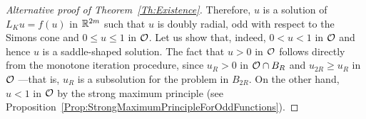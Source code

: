 \begin{proof}[Alternative proof of Theorem~\ref{Th:Existence}]
	Therefore, $u$ is a solution of $L_K u = f(u)$ in $\mathbb{R}^{2m}$ such that $u$ is doubly radial, odd with respect to the Simons cone and $0\leq u \leq 1$ in $\mathcal{O}$. Let us show that, indeed, $0 < u < 1$ in $\mathcal{O}$ and hence $u$ is a saddle-shaped solution. The fact that $u>0$ in $\mathcal{O}$ follows directly from the monotone iteration procedure, since $u_{R} > 0$ in $\mathcal{O} \cap B_R$ and $u_{2R} \geq u_{R}$ in $\mathcal{O}$ ---that is, $u_{R}$ is a subsolution for the problem in $B_{2R}$. On the other hand, $u < 1$ in $\mathcal{O}$ by the strong maximum principle (see Proposition~\ref{Prop:StrongMaximumPrincipleForOddFunctions}).
\end{proof}


